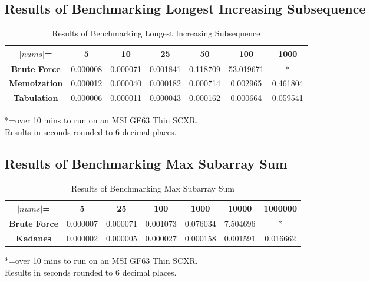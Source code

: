 \subsection{Results of Benchmarking Longest Increasing Subsequence}
\begin{table}[H]
    \centering
    \begin{tabular}{|c|c|c|c|c|c|c|}
        \hline
        \textbf{$|nums|$=}  & \textbf{5} & \textbf{10} & \textbf{25} & \textbf{50} & \textbf{100}  & \textbf{1000} \\
        \hline
        \textbf{Brute Force} & 0.000008 & 0.000071 & 0.001841 & 0.118709 & 53.019671 & * \\
        \hline
        \textbf{Memoization} & 0.000012 & 0.000040 & 0.000182 & 0.000714 & 0.002965 & 0.461804 \\
        \hline
        \textbf{Tabulation} & 0.000006 & 0.000011 & 0.000043 & 0.000162 & 0.000664 & 0.059541 \\
        \hline
    \end{tabular}
    \caption{Results of Benchmarking Longest Increasing Subsequence}
\end{table}
*=over 10 mins to run on an MSI GF63 Thin SCXR.\\
Results in seconds rounded to 6 decimal places.

\subsection{Results of Benchmarking Max Subarray Sum}
\begin{table}[H]
    \centering
    \begin{tabular}{|c|c|c|c|c|c|c|}
        \hline
        \textbf{$|nums|$=}  & \textbf{5} & \textbf{25} & \textbf{100} & \textbf{1000} & \textbf{10000}  & \textbf{1000000} \\
        \hline
        \textbf{Brute Force} & 0.000007 & 0.000071 & 0.001073 & 0.076034 & 7.504696 & * \\
        \hline
        \textbf{Kadanes} & 0.000002 & 0.000005 & 0.000027 & 0.000158 & 0.001591 & 0.016662 \\
        \hline
    \end{tabular}
    \caption{Results of Benchmarking Max Subarray Sum}
\end{table}
*=over 10 mins to run on an MSI GF63 Thin SCXR.\\
Results in seconds rounded to 6 decimal places.

